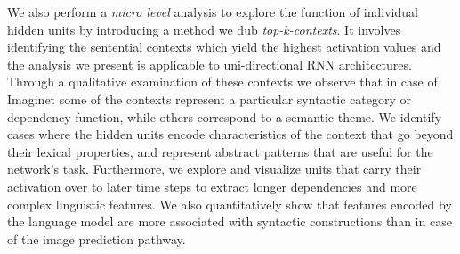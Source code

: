 
We also perform a \emph{micro level} analysis to explore \label{edit:introtopkgeneral}
the function of individual hidden units by introducing a method we dub \emph{top-k-contexts}.
It involves identifying the sentential contexts which yield the 
highest activation values and the analysis we present is applicable 
to uni-directional RNN architectures.
Through a qualitative examination of these contexts we
observe that in case of {\sc Imaginet} some of the contexts represent a particular 
syntactic category or dependency function, while others correspond to a semantic theme. 
We identify cases where the hidden units encode characteristics of 
the context that go beyond their lexical properties, and represent abstract 
patterns that are useful for the network's task. 
Furthermore, we explore and visualize units that carry their
activation over to later time steps to 
extract longer dependencies and more complex linguistic features. 
We also quantitatively show that features encoded by the language model are more associated 
with syntactic constructions than in case of the image prediction pathway.

%





